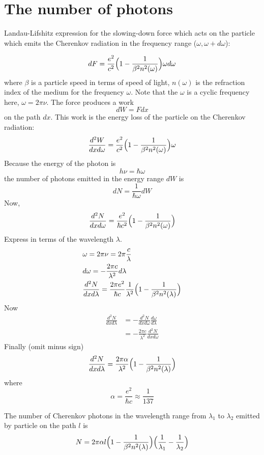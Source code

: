 \documentclass[english]{article}
\begin{document}
\section{The number of photons}

Landau-Lifshitz expression for the slowing-down force which acts on the particle which emits the Cherenkov radiation in the frequency range ($\omega, \omega+d\omega$):

$$
dF = \frac{e^2}{c^2} \Bigl( 1 - \frac1{\beta^2 n^2(\omega)} \Bigr) \omega d\omega
$$
where $\beta$ is a particle speed in terms of speed of light, $n(\omega)$ is the refraction index of the medium for the frequency $\omega$. Note that the $\omega$ is a cyclic frequency here, 
$\omega = 2\pi\nu$. 
The force produces a work 
$$
dW = Fdx
$$
on the path $dx$. This work is the energy loss of the particle on the Cherenkov radiation: 
$$
\frac{d^2W}{dx d\omega} = 
\frac{e^2}{c^2} \Bigl( 1 - \frac1{\beta^2 n^2(\omega)} \Bigr) \omega
$$
Because the energy of the photon is 
$$
h\nu = \hbar\omega
$$
the number of photons emitted in the energy range $dW$ is 
$$
dN = \frac1{\hbar\omega}dW
$$
Now, 
$$
\frac{d^2N}{dxd\omega} = \frac{e^2}{\hbar c^2} \Bigl( 1 - \frac1{\beta^2 n^2(\omega)} \Bigr)
$$
Express in terms of the wavelength $\lambda$.
\begin{align*}
& \omega = 2\pi\nu = 2\pi\frac{c}{\lambda} \\
& d\omega = -\frac{2\pi c}{\lambda^2} d\lambda \\
& \frac{d^2N}{dxd\lambda} = \frac{2\pi e^2}{\hbar c} \frac1{\lambda^2}
\Bigl( 1 - \frac1{\beta^2 n^2(\lambda)} \Bigr)\\
\end{align*}
Now 
\begin{align*}
\frac{d^2N}{dxd\lambda} & = - \frac{d^2N}{dxd\omega} \frac{d\omega}{d\lambda} \\
                        & = - \frac{2\pi c}{\lambda^2} \frac{d^2N}{dxd\omega}
\end{align*}
Finally (omit minus sign) 
$$
\frac{d^2N}{dxd\lambda} = \frac{2\pi \alpha}{\lambda^2} 
\Bigl( 1 - \frac1{\beta^2 n^2(\lambda)} \Bigr)
$$
where
$$
\alpha = \frac{e^2}{\hbar c} \approx \frac1{137}
$$

The number of Cherenkov photons in the wavelength range from $\lambda_1$ to $\lambda_2$ emitted by particle on the path $l$ is 
\begin{align*}
N = 2\pi \alpha l
\Bigl( 1 - \frac1{\beta^2 n^2(\lambda)} \Bigr)
\Bigl(\frac1{\lambda_1} - \frac1{\lambda_2} \Bigr)
\end{align*}
\end{document}
